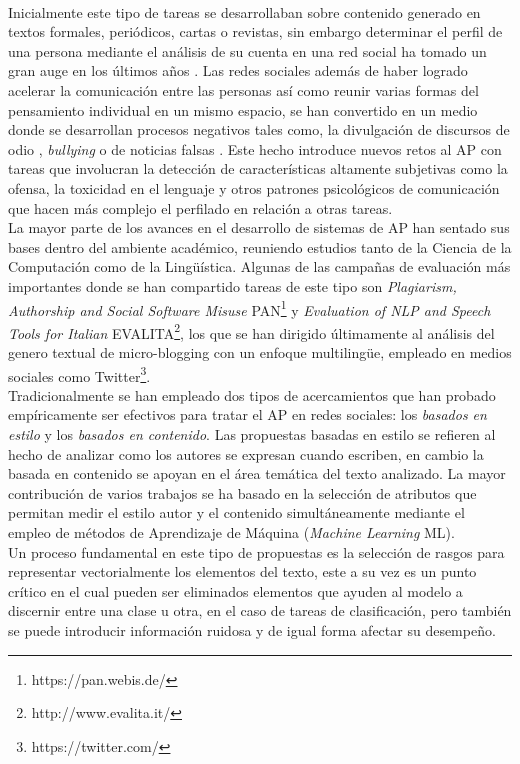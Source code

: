 \\
Inicialmente este tipo de tareas se desarrollaban sobre contenido generado en textos formales, periódicos, cartas o revistas, sin embargo determinar el perfil de una persona mediante el análisis de su cuenta en una red social ha tomado un gran auge en los últimos años \citep{rangel:2018,rangel:2019,f6032ffbacb14369b7a45d1ba9bd0b8c}.
 Las redes sociales además de haber logrado acelerar la comunicación entre las personas así como reunir varias formas del pensamiento individual en un mismo espacio, se han convertido en un medio donde se desarrollan procesos negativos tales como, la divulgación de discursos de odio \citep{rangel2021profiling}, \textit{bullying} o de noticias falsas \citep{rangel:2020}. Este hecho introduce nuevos retos al AP con tareas que involucran la detección de características altamente subjetivas como la ofensa, la toxicidad en el lenguaje y otros patrones psicológicos de comunicación que hacen más complejo el perfilado en relación a otras tareas.  
\\
 La mayor parte de los avances en el desarrollo de sistemas de AP han sentado sus bases dentro del ambiente académico, reuniendo estudios tanto de la Ciencia de la Computación como de la Lingüística. Algunas de las campañas de evaluación más importantes donde se han compartido tareas de este tipo son \textit{Plagiarism, Authorship and Social Software Misuse} PAN\footnote{https://pan.webis.de/} y \textit{Evaluation of NLP and Speech Tools for Italian} EVALITA\footnote{http://www.evalita.it/}, los que se han dirigido últimamente al análisis del genero textual de micro-blogging  con un enfoque multilingüe, empleado en medios sociales como Twitter\footnote{https://twitter.com/}.
\\
Tradicionalmente se han empleado dos tipos de acercamientos que han probado empíricamente ser efectivos para tratar el AP en redes sociales: los \textit{basados en estilo}  y los \textit{basados en contenido}. Las propuestas basadas en estilo se refieren al hecho de analizar como los autores se expresan cuando escriben, en cambio la basada en contenido se apoyan en el área temática del texto analizado. La mayor contribución de varios trabajos se ha basado en la selección de atributos que permitan medir el estilo autor y el contenido simultáneamente mediante el empleo de métodos de Aprendizaje de Máquina (\textit{Machine Learning} ML).
\\
Un proceso fundamental en este tipo de propuestas es la selección de rasgos para representar vectorialmente los elementos del texto, este a su vez es un punto crítico en el cual pueden ser eliminados elementos que ayuden al modelo a discernir entre una clase u otra, en el caso de tareas de clasificación, pero también se puede introducir información ruidosa y de igual forma afectar su desempeño. 
